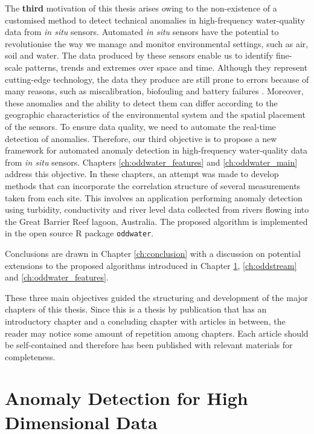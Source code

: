 \documentclass{monashthesis}
\theoremstyle{definition}
\theoremstyle{definition}
\theoremstyle{definition}
\theoremstyle{remark}
\begin{document}
The \textbf{third} motivation of this thesis arises owing to the non-existence of a customised method to detect technical anomalies in high-frequency water-quality data from \emph{in situ} sensors. Automated \emph{in situ} sensors have the potential to revolutionise the way we manage and monitor environmental settings, such as air, soil and water. The data produced by these sensors enable us to identify fine-scale patterns, trends and extremes over space and time. Although they represent cutting-edge technology, the data they produce are still prone to errors because of many reasons, such as miscalibration, biofouling and battery failures \autocite{horsburgh2015open}. Moreover, these anomalies and the ability to detect them can differ according to the geographic characteristics of the environmental system and the spatial placement of the sensors. To ensure data quality, we need to automate the real-time detection of anomalies. Therefore, our third objective is to propose a new framework for automated anomaly detection in high-frequency water-quality data from \emph{in situ} sensors.
Chapters \ref{ch:oddwater_features} and \ref{ch:oddwater_main} address this objective. In these chapters, an attempt was made to develop methods that can incorporate the correlation structure of several measurements taken from each site. This involves an application performing anomaly detection using turbidity, conductivity and river level data collected from rivers flowing into the Great Barrier Reef lagoon, Australia. The proposed algorithm is implemented in the open source R package \texttt{oddwater}.

Conclusions are drawn in Chapter \ref{ch:conclusion} with a discussion on potential extensions to the proposed algorithms introduced in Chapter \ref{ch:stray}, \ref{ch:oddstream} and \ref{ch:oddwater_features}.

These three main objectives guided the structuring and development of the major chapters of this thesis. Since this is a thesis by publication that has an introductory chapter and a concluding chapter with articles in between, the reader may notice some amount of repetition among chapters. Each article should be self-contained and therefore has been published with relevant materials for completeness.

\hypertarget{ch:stray}{%
\chapter{Anomaly Detection for High Dimensional Data}\label{ch:stray}}
\end{document}

